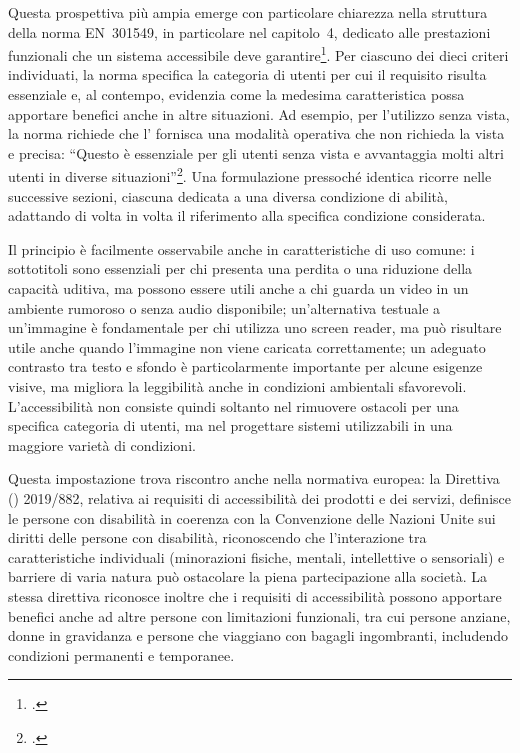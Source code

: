 Questa prospettiva più ampia emerge con particolare chiarezza nella struttura della norma EN~301549, in particolare nel capitolo~4, dedicato alle prestazioni funzionali che un sistema accessibile deve garantire\footcite[cap.~4 \enquote{Prestazioni funzionali}]{norma:en301549}. Per ciascuno dei dieci criteri individuati, la norma specifica la categoria di utenti per cui il requisito risulta essenziale e, al contempo, evidenzia come la medesima caratteristica possa apportare benefici anche in altre situazioni. Ad esempio, per l'utilizzo senza vista, la norma richiede che l'  fornisca una modalità operativa che non richieda la vista e precisa: \enquote{Questo è essenziale per gli utenti senza vista e avvantaggia molti altri utenti in diverse situazioni}\footcite[§~4.2.1 \enquote{Utilizzo senza vista}]{norma:en301549}. Una formulazione pressoché identica ricorre nelle successive sezioni, ciascuna dedicata a una diversa condizione di abilità, adattando di volta in volta il riferimento alla specifica condizione considerata.

Il principio è facilmente osservabile anche in caratteristiche di uso comune: i sottotitoli sono essenziali per chi presenta una perdita o una riduzione della capacità uditiva, ma possono essere utili anche a chi guarda un video in un ambiente rumoroso o senza audio disponibile; un'alternativa testuale a un'immagine è fondamentale per chi utilizza uno screen reader, ma può risultare utile anche quando l'immagine non viene caricata correttamente; un adeguato contrasto tra testo e sfondo è particolarmente importante per alcune esigenze visive, ma migliora la leggibilità anche in condizioni ambientali sfavorevoli. L'accessibilità non consiste quindi soltanto nel rimuovere ostacoli per una specifica categoria di utenti, ma nel progettare sistemi utilizzabili in una maggiore varietà di condizioni.

Questa impostazione trova riscontro anche nella normativa europea: la Direttiva () 2019/882, relativa ai requisiti di accessibilità dei prodotti e dei servizi, definisce le persone con disabilità in coerenza con la Convenzione delle Nazioni Unite sui diritti delle persone con disabilità, riconoscendo che l'interazione tra caratteristiche individuali (minorazioni fisiche, mentali, intellettive o sensoriali) e barriere di varia natura può ostacolare la piena partecipazione alla società. La stessa direttiva riconosce inoltre che i requisiti di accessibilità possono apportare benefici anche ad altre persone con limitazioni funzionali, tra cui persone anziane, donne in gravidanza e persone che viaggiano con bagagli ingombranti, includendo condizioni permanenti e temporanee.

